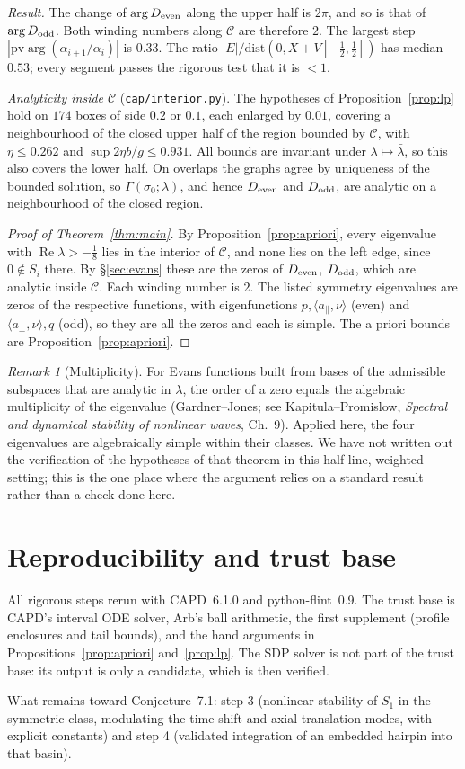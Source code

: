 \documentclass[11pt]{amsart}
\theoremstyle{remark}
\newtheorem{remark}[theorem]{Remark}
\newcommand{\ip}[2]{\langle #1,#2\rangle}
\newcommand{\re}{\operatorname{Re}}
\begin{document}
\emph{Result.} The change of $\arg D_{\rm even}$ along the upper half is $2\pi$, and so is that of $\arg D_{\rm odd}$. Both winding numbers along $\mathcal C$ are therefore $2$. The largest step $|\mathrm{pv}\arg(\alpha_{i+1}/\alpha_i)|$ is $0.33$. The ratio $|E|/\mathrm{dist}(0,X+V[-\frac12,\frac12])$ has median $0.53$; every segment passes the rigorous test that it is $<1$.

\emph{Analyticity inside $\mathcal C$} (\texttt{cap/interior.py}). The hypotheses of Proposition~\ref{prop:lp} hold on $174$ boxes of side $0.2$ or $0.1$, each enlarged by $0.01$, covering a neighbourhood of the closed upper half of the region bounded by $\mathcal C$, with $\eta\le0.262$ and $\sup2\eta b/g\le0.931$. All bounds are invariant under $\lambda\mapsto\bar\lambda$, so this also covers the lower half. On overlaps the graphs agree by uniqueness of the bounded solution, so $\Gamma(\sigma_0;\lambda)$, and hence $D_{\rm even}$ and $D_{\rm odd}$, are analytic on a neighbourhood of the closed region.

\begin{proof}[Proof of Theorem~\ref{thm:main}]
By Proposition~\ref{prop:apriori}, every eigenvalue with $\re\lambda>-\frac18$ lies in the interior of $\mathcal C$, and none lies on the left edge, since $0\notin S_i$ there. By \S\ref{sec:evans} these are the zeros of $D_{\rm even}$, $D_{\rm odd}$, which are analytic inside $\mathcal C$. Each winding number is $2$. The listed symmetry eigenvalues are zeros of the respective functions, with eigenfunctions $p,\ip{a_\parallel}{\nu}$ (even) and $\ip{a_\perp}{\nu},q$ (odd), so they are all the zeros and each is simple. The a priori bounds are Proposition~\ref{prop:apriori}.
\end{proof}

\begin{remark}[Multiplicity]
For Evans functions built from bases of the admissible subspaces that are analytic in $\lambda$, the order of a zero equals the algebraic multiplicity of the eigenvalue (Gardner--Jones; see Kapitula--Promislow, \emph{Spectral and dynamical stability of nonlinear waves}, Ch.~9). Applied here, the four eigenvalues are algebraically simple within their classes. We have not written out the verification of the hypotheses of that theorem in this half-line, weighted setting; this is the one place where the argument relies on a standard result rather than a check done here.
\end{remark}

\section{Reproducibility and trust base}
All rigorous steps rerun with CAPD~6.1.0 and python-flint~0.9. The trust base is CAPD's interval ODE solver, Arb's ball arithmetic, the first supplement (profile enclosures and tail bounds), and the hand arguments in Propositions~\ref{prop:apriori} and~\ref{prop:lp}. The SDP solver is not part of the trust base: its output is only a candidate, which is then verified.

What remains toward Conjecture~7.1: step 3 (nonlinear stability of $S_1$ in the symmetric class, modulating the time-shift and axial-translation modes, with explicit constants) and step 4 (validated integration of an embedded hairpin into that basin).
\end{document}
